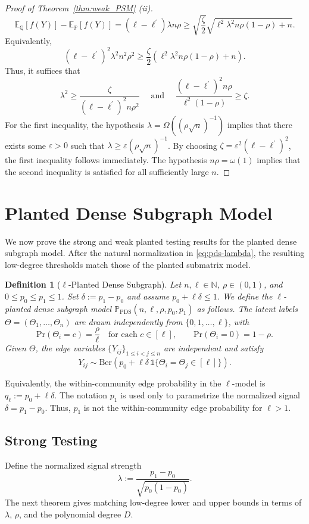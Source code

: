 \documentclass[11pt, letterpaper]{article}
\newtheorem{definition}[theorem]{Definition}
\numberwithin{equation}{section}
\begin{document}
\begin{proof}[Proof of Theorem~\ref{thm:weak_PSM} \textnormal{(ii)}]
\[
\mathbb{E}_{\mathbb{Q}}[f(Y)] - \mathbb{E}_{\mathbb{P}}[f(Y)] =(\ell - \ell^{\prime}) \lambda n \rho  \geq  
\sqrt{\frac{\zeta}{2}}\sqrt{\ell^{2}\lambda^2n\rho(1-\rho) + n}.
\]
Equivalently,
\[
(\ell - \ell^{\prime})^2 \lambda^2 n^2 \rho^2    \geq \frac{\zeta}{2} (\ell^{2}\lambda^2n\rho(1-\rho) + n).
\]
Thus, it suffices that
\[
\lambda^2 \geq \frac{\zeta}{(\ell-\ell^{\prime})^2 n \rho^2}
\quad \text{ and } \quad
\frac{(\ell - \ell^{\prime})^2 n \rho}{\ell^{2}(1-\rho)} \geq \zeta.
\]
 For the first inequality, the hypothesis $\lambda=\Omega((\rho\sqrt{n})^{-1})$ implies that there exists some $\varepsilon>0$ such that $\lambda\ge\varepsilon(\rho\sqrt{n})^{-1}$. By choosing $\zeta = \varepsilon^2(\ell-\ell^{\prime})^2$, the first inequality follows immediately. The hypothesis $n\rho = \omega(1)$ implies that the second inequality is satisfied for all sufficiently large $n$.
\end{proof}


\section{Planted Dense Subgraph Model}\label{sec:pds-testing}
We now prove the strong and weak planted testing results for the planted dense
subgraph model. After the natural normalization in \eqref{eq:pds-lambda}, the resulting low-degree thresholds match those of the planted submatrix model.
\begin{definition}[$\ell$-Planted Dense Subgraph]\label{def:PDS}
Let \(n,\ell\in\mathbb N\), \(\rho\in(0,1)\), and \(0\le p_0\le p_1\le 1\).
Set $\delta:=p_1-p_0$
and assume \(p_0+\ell\delta\le 1\). We define the
\(\ell\)-planted dense subgraph model
\(\mathbb P_{\mathrm{PDS}}(n,\ell,\rho,p_0,p_1)\) as follows.
The latent labels \(\Theta=(\Theta_1,\dots,\Theta_n)\) are drawn independently
from \(\{0,1,\dots,\ell\}\), with
\[
\mathrm{Pr}(\Theta_i=c)=\frac{\rho}{\ell}
\quad\text{for each }c\in[\ell],
\qquad
\mathrm{Pr}(\Theta_i=0)=1-\rho.
\]
Given \(\Theta\), the edge variables \(\{Y_{ij}\}_{1\le i<j\le n}\) are
independent and satisfy
\[
Y_{ij}\sim
\mathrm{Ber} \left(
p_0+\ell\delta\,\mathds 1\{\Theta_i=\Theta_j\in[\ell]\}
\right).
\]
\end{definition}
Equivalently, the within-community edge probability in the $\ell$-model is
$q_\ell:=p_0+\ell\delta$. The notation $p_1$ is used only to parametrize
the normalized signal $\delta=p_1-p_0$. Thus, $p_1$ is not the
within-community edge probability for $\ell>1$. 
\subsection{Strong Testing}
Define the normalized signal strength
\begin{equation}\label{eq:pds-lambda}
\lambda := \frac{p_1-p_0}{\sqrt{p_0(1-p_0)}}.    
\end{equation}
The next theorem gives matching low-degree lower and upper bounds in terms of $\lambda$, $\rho$, and the polynomial degree $D$.
\end{document}
